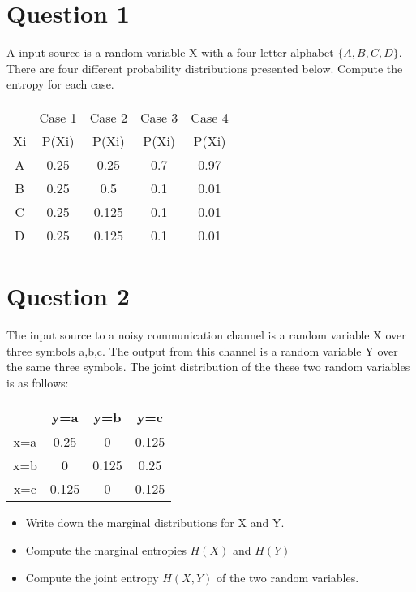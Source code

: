

\section*{Question 1}

A input source is a random variable X with a four letter alphabet $\{A,B,C,D\}$.
There are four different probability distributions presented below. 
Compute the entropy for each case.

\begin{tabular}{|c|c|c|c|c|}
\hline
	&	Case 1	&	Case 2	&	Case 3	&	Case 4	\\	
Xi	&	P(Xi)	&	P(Xi)	&	P(Xi)	&	P(Xi)	\\	\hline
A	&	0.25	&	0.25	&	0.7	&	0.97	\\	\hline
B	&	0.25	&	0.5	&	0.1	&	0.01	\\	\hline
C	&	0.25	&	0.125	&	0.1	&	0.01	\\	\hline
D	&	0.25	&	0.125	&	0.1	&	0.01	\\	\hline
\end{tabular} 


\section{Question 2}
The input source to a noisy communication channel is a random variable X over three symbols a,b,c. The output from this channel is a random variable Y over the same three symbols. The joint distribution of the these two random variables is as follows:

\begin{tabular}{|c|c|c|c|}
\hline	&	y=a	&	y=b	&	y=c	\\	\hline
x=a	&	0.25	&	0	&	0.125	\\	\hline
x=b	&	0	&	0.125	&	0.25	\\	\hline
x=c	&	0.125	&	0	&	0.125	\\	\hline
\end{tabular} 

\begin{itemize}
\item Write down the marginal distributions for X and Y.

\item Compute the marginal entropies $H(X)$ and $H(Y)$

\item Compute the joint entropy $H(X,Y)$ of the two random variables.
\end{itemize}
